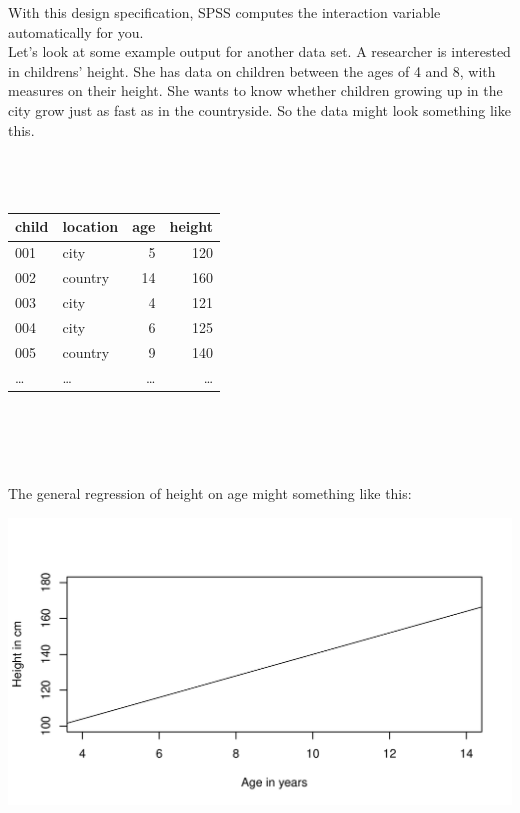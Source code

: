 \documentclass[]{report}\usepackage[]{graphicx}\usepackage[]{color}
\makeatletter
\def\maxwidth{ %
  \ifdim\Gin@nat@width>\linewidth
    \linewidth
  \else
    \Gin@nat@width
  \fi
}
\newenvironment{knitrout}{}{} %
\makeatother
\begin{document}
With this design specification, SPSS computes the interaction variable automatically for you.
\\
Let's look at some example output for another data set. A researcher is interested in childrens' height. She has data on children between the ages of 4 and 8, with measures on their height. She wants to know whether children growing up in the city grow just as fast as in the countryside. So the data might look something like this.
 \\
 \\
 \\
 \\
 \begin{tabular}{llrr}
 child & location & age & height\\ \hline
 001 & city & 5 & 120\\
 002 & country & 14 & 160\\
 003 & city & 4 & 121\\
 004 & city & 6 & 125\\
 005 & country & 9 & 140\\
 \dots & \dots & \dots & \dots\\
 \end{tabular}
\\
\\
\\
 \\
The general regression of height on age might something like this:
\begin{knitrout}
\color{fgcolor}

{\centering \includegraphics[width=\maxwidth]{figure/summary_plot1-1} 

}



\end{knitrout}
\end{document}
